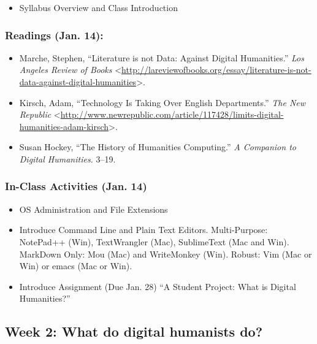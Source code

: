 \documentclass[]{article}
\begin{document}
\begin{itemize}
\itemsep1pt\parskip0pt
\item
  Syllabus Overview and Class Introduction
\end{itemize}

\subsubsection{Readings (Jan. 14):}\label{readings-jan.-14}

\begin{itemize}
\itemsep1pt\parskip0pt
\item
  Marche, Stephen, ``Literature is not Data: Against Digital
  Humanities.'' \emph{Los Angeles Review of Books}
  \textless{}\url{http://lareviewofbooks.org/essay/literature-is-not-data-against-digital-humanities}\textgreater{}.
\item
  Kirsch, Adam, ``Technology Is Taking Over English Departments.''
  \emph{The New Republic}
  \textless{}\url{http://www.newrepublic.com/article/117428/limits-digital-humanities-adam-kirsch}\textgreater{}.
\item
  Susan Hockey, ``The History of Humanities Computing.'' \emph{A
  Companion to Digital Humanities.} 3--19.
\end{itemize}

\subsubsection{In-Class Activities (Jan.
14)}\label{in-class-activities-jan.-14}

\begin{itemize}
\itemsep1pt\parskip0pt
\item
  OS Administration and File Extensions
\item
  Introduce Command Line and Plain Text Editors. Multi-Purpose:
  NotePad++ (Win), TextWrangler (Mac), SublimeText (Mac and Win).
  MarkDown Only: Mou (Mac) and WriteMonkey (Win). Robust: Vim (Mac or
  Win) or emacs (Mac or Win).
\item
  Introduce Assignment (Due Jan. 28) ``A Student Project: What is
  Digital Humanities?''
\end{itemize}

\subsection{Week 2: What do digital humanists
do?}\label{week-2-what-do-digital-humanists-do}
\end{document}
